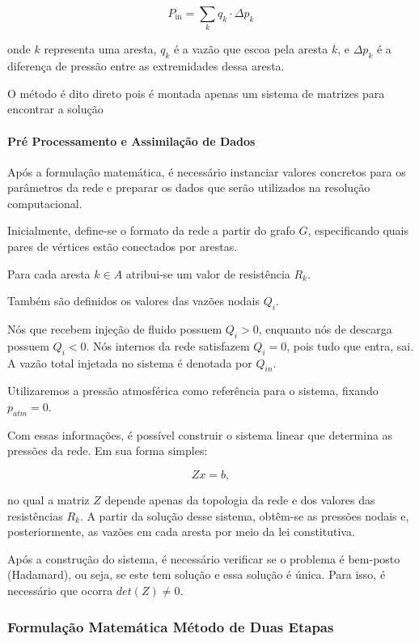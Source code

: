 \documentclass{article}
\begin{document}
\begin{equation}
    P_{\text{in}} = \sum_{k} q_k \cdot \Delta p_k
\end{equation}

onde $k$ representa uma aresta, $q_k$ é a vazão que escoa pela aresta $k$, e $\Delta p_k$ é a diferença de pressão entre as extremidades dessa aresta. 

\par O método é dito direto pois é montada apenas um sistema de matrizes para encontrar a solução

\paragraph{Pré Processamento e Assimilação de Dados}


Após a formulação matemática, é necessário instanciar
valores concretos para os parâmetros da rede e preparar os dados que
serão utilizados na resolução computacional.

Inicialmente, define-se o formato da rede a partir do grafo $G$, especificando quais pares
de vértices estão conectados por arestas. 

Para cada aresta $k \in A$ atribui-se um valor de resistência $R_k$.

Também são definidos os valores das vazões nodais $Q_i$.

Nós que recebem injeção de fluido possuem $Q_i>0$, enquanto nós de
descarga possuem $Q_i<0$. Nós internos da rede satisfazem $Q_i=0$, pois tudo que entra, sai.
A vazão total injetada no sistema é denotada por $Q_{in}$.

Utilizaremos a pressão atmosférica como referência para o sistema,
fixando $p_{atm} = 0$.

Com essas informações, é possível construir o sistema linear que
determina as pressões da rede. Em sua forma simples:

\[
Zx = b ,
\]

no qual a matriz $Z$ depende apenas da topologia da rede e dos valores
das resistências $R_k$. A partir da solução desse sistema, obtêm-se as
pressões nodais e, posteriormente, as vazões em cada aresta por meio
da lei constitutiva.

Após a construção do sistema, é necessário verificar se o problema é bem-posto (Hadamard), ou seja, se este tem solução e essa solução é única. Para isso, é necessário que ocorra  $det(Z)\neq0$.


\subsubsection{Formulação Matemática Método de Duas Etapas}
\end{document}
